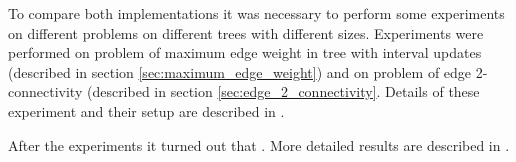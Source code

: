 To compare both implementations it was necessary to perform some experiments on
different problems on different trees with different sizes. Experiments were
performed on problem of {\I maximum edge weight in tree with interval updates}
(described in section \ref{sec:maximum_edge_weight}) and on problem of {\I edge
2-connectivity} (described in section \ref{sec:edge_2_connectivity}. Details of
these experiment and their setup are described in .

After the experiments it turned out that
.
More detailed results are described in .
